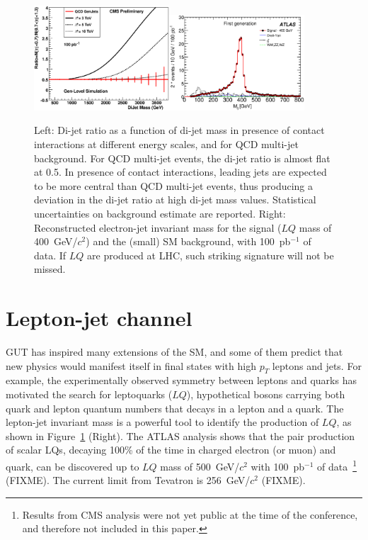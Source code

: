 \documentclass{cimento}
\begin{document}
\begin{figure}[htbp] 
\centering
\includegraphics[width=0.45\textwidth]{DiJetRatio100pbOptFix.eps}\includegraphics[width=0.45\textwidth]{Mejfig5R.eps}  
\caption{Left: Di-jet ratio as a function of di-jet mass in presence of 
contact interactions at different energy scales, 
and for QCD multi-jet background. 
For QCD multi-jet events, the di-jet ratio is almost flat at 0.5. 
In presence of contact interactions, 
leading jets are expected to be more central than QCD multi-jet events, 
thus producing a deviation in the di-jet ratio at high di-jet mass values.
Statistical uncertainties on background estimate are reported.  
Right: Reconstructed electron-jet invariant mass for the signal 
($LQ$ mass of 400~GeV/$c^2$) and the (small) SM background, 
with 100~pb$^{-1}$ of data. If $LQ$ are produced at LHC, 
such striking signature will not be missed.}
\label{fig:DiJetRatioAndLQMej}
\end{figure}

\section{Lepton-jet channel} \label{leptonjet}
GUT has inspired many extensions of the SM, and some 
of them predict that new physics would manifest itself in 
final states with high $p_T$ leptons and jets.
For example, the experimentally observed symmetry between 
leptons and quarks has motivated the search for leptoquarks ($LQ$), 
hypothetical bosons carrying both quark and lepton quantum numbers 
that decays in a lepton and a quark.
The lepton-jet invariant mass is a powerful tool to identify the production 
of $LQ$, as shown in Figure~\ref{fig:DiJetRatioAndLQMej} (Right). 
The ATLAS analysis shows that the pair production of scalar LQs,  
decaying 100\% of the time in charged electron (or muon) and quark, 
can be discovered up to $LQ$ mass of 500~GeV/$c^2$ with 100~pb$^{-1}$ of 
data~\footnote{Results from CMS analysis were not yet public at the time 
of the conference, and therefore not included in this paper.} (FIXME).
The current limit from Tevatron is 256~GeV/$c^2$ (FIXME).
\end{document}
